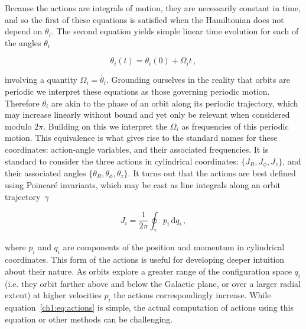  Because the actions are integrals of motion, they are necessarily constant in time, and so the first of these equations is satisfied when the Hamiltonian does not depend on $\theta_{i}$. The second equation yields simple linear time evolution for each of the angles $\theta_{i}$ 

\begin{equation}
    \label{ch1:eq:angle-evolution}
    \theta_{i}(t) = \theta_{i}(0) + \Omega_{i}t\,,
\end{equation}

\noindent involving a quantity $\Omega_{i} = \dot{\theta_{i}}$. Grounding ourselves in the reality that orbits are periodic we interpret these equations as those governing periodic motion. Therefore $\theta_{i}$ are akin to the phase of an orbit along its periodic trajectory, which may increase linearly without bound and yet only be relevant when considered modulo $2\pi$. Building on this we interpret the $\Omega_{i}$ as frequencies of this periodic motion. This equivalence is what gives rise to the standard names for these coordinates: action-angle variables, and their associated frequencies. It is standard to consider the three actions in cylindrical coordinates: $\{J_{R}, J_{\phi}, J_{z}\}$, and their associated angles $\{\theta_{R}, \theta_{\phi}, \theta_{z}\}$. It turns out that the actions are best defined using Poincar\'{e} invariants, which may be cast as line integrals along an orbit trajectory~$\gamma$ 

\begin{equation}
    \label{ch1:eq:actions}
    J_{i} = \frac{1}{2\pi}\oint_{\gamma} p_{i}\, \mathrm{d}q_{i}\,,
\end{equation}

\noindent where $p_{i}$ and $q_{i}$ are components of the position and momentum in cylindrical coordinates. This form of the actions is useful for developing deeper intuition about their nature. As orbits explore a greater range of the configuration space $q_{i}$ (i.e. they orbit farther above and below the Galactic plane, or over a larger radial extent) at higher velocities $p_{i}$ the actions correspondingly increase. While equation~\eqref{ch1:eq:actions} is simple, the actual computation of actions using this equation or other methods can be challenging.

